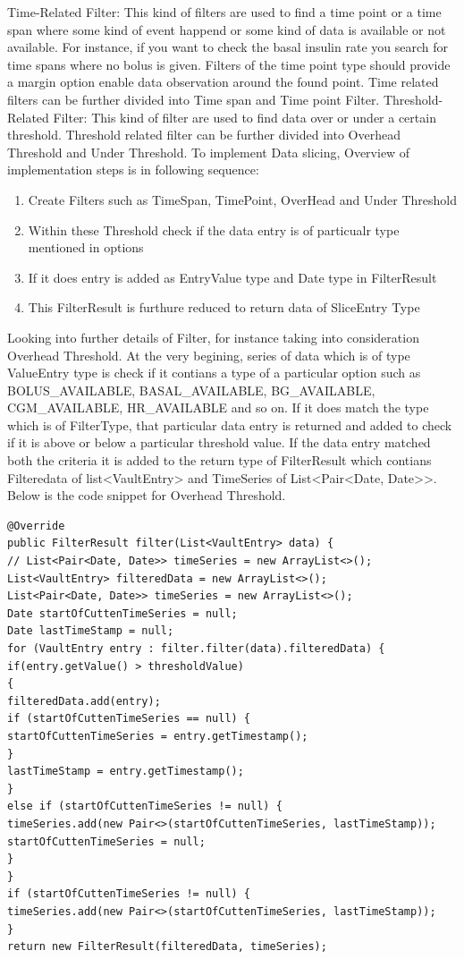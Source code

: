 \documentclass[article,type=msc,colorback,accentcolor=tud9c,twoside,11pt]{tudthesis}
\begin{document}
Time-Related Filter: This kind of filters are used to find a time point or a time span where some kind of event happend or some kind of data is available or not available. For instance, if you want to check the basal insulin rate you search for time spans where no bolus is given. Filters of the time point type should provide a margin option enable data observation around the found point. Time related filters can be further divided into Time span and Time point Filter. Threshold-Related Filter: This kind of filter are used to find data over or under a certain threshold. Threshold related filter can be further divided into Overhead Threshold and Under Threshold.
To implement Data slicing, Overview of implementation steps is in following sequence:
\begin{enumerate}
	\item Create Filters such as TimeSpan, TimePoint, OverHead and Under Threshold
	\item Within these Threshold check if the data entry is of particualr type mentioned in options 
	\item If it does entry is added as EntryValue type and Date type in FilterResult
	\item This FilterResult is furthure reduced to return data of SliceEntry Type
\end{enumerate}
Looking into further details of Filter, for instance taking into consideration Overhead Threshold. At the very begining, series of data which is of type ValueEntry type is check if it contians a type of a particular option such as BOLUS\_AVAILABLE, BASAL\_AVAILABLE, BG\_AVAILABLE, CGM\_AVAILABLE, HR\_AVAILABLE and so on. If it does match the type which is of FilterType, that particular data entry is returned and added to check if it is above or below a particular threshold value. If the data entry matched both the criteria it is added to the return type of FilterResult which contians Filteredata of list<VaultEntry> and TimeSeries of List<Pair<Date, Date>>. Below is the code snippet for Overhead Threshold.
\begin{lstlisting}
@Override
public FilterResult filter(List<VaultEntry> data) {
// List<Pair<Date, Date>> timeSeries = new ArrayList<>();
List<VaultEntry> filteredData = new ArrayList<>();
List<Pair<Date, Date>> timeSeries = new ArrayList<>();
Date startOfCuttenTimeSeries = null;
Date lastTimeStamp = null;
for (VaultEntry entry : filter.filter(data).filteredData) {
if(entry.getValue() > thresholdValue)
{               
filteredData.add(entry);
if (startOfCuttenTimeSeries == null) {
startOfCuttenTimeSeries = entry.getTimestamp();
}
lastTimeStamp = entry.getTimestamp();
}
else if (startOfCuttenTimeSeries != null) {
timeSeries.add(new Pair<>(startOfCuttenTimeSeries, lastTimeStamp));
startOfCuttenTimeSeries = null;
}
}
if (startOfCuttenTimeSeries != null) {
timeSeries.add(new Pair<>(startOfCuttenTimeSeries, lastTimeStamp));
}
return new FilterResult(filteredData, timeSeries); 
\end{lstlisting}
\end{document}
